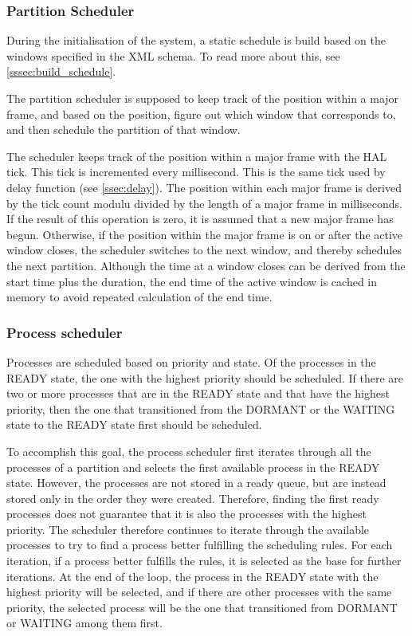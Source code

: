 \subsubsection{Partition Scheduler}
During the initialisation of the system, a static schedule is build based on the
windows specified in the XML schema. To read more about this, see \ref{sssec:build_schedule}.

The partition scheduler is supposed to keep track of the position within a major
frame, and based on the position, figure out which window that corresponds to,
and then schedule the partition of that window.

The scheduler keeps track of the position within a major frame with the HAL
tick. This tick is incremented every millisecond. This is the same tick used by
delay function (see \ref{ssec:delay}). The position within each major frame is
derived by the tick count modulu divided by the length of a major frame in
milliseconds. If the result of this operation is zero, it is assumed that a new
major frame has begun. Otherwise, if the position within the major frame is on
or after the active window closes, the scheduler switches to the next window,
and thereby schedules the next partition. Although the time at a window closes
can be derived from the start time plus the duration, the end time of the
active window is cached in memory to avoid repeated calculation of the end time.

\subsubsection{Process scheduler}
Processes are scheduled based on priority and state. Of the processes in the
READY state, the one with the highest priority should be scheduled. If there are
two or more processes that are in the READY state and that have the highest
priority, then the one that transitioned from the DORMANT or the WAITING state
to the READY state first should be scheduled.

To accomplish this goal, the process scheduler first iterates through all the
processes of a partition and selects the first available process in the READY
state. However, the processes are not stored in a ready queue, but are instead
stored only in the order they were created. Therefore, finding the first ready
processes does not guarantee that it is also the processes with the highest
priority. The scheduler therefore continues to iterate through the available
processes to try to find a process better fulfilling the scheduling rules. For
each iteration, if a process better fulfills the rules, it is selected as the
base for further iterations. At the end of the loop, the process in the READY
state with the highest priority will be selected, and if there are other
processes with the same priority, the selected process will be the one that
transitioned from DORMANT or WAITING among them first.


